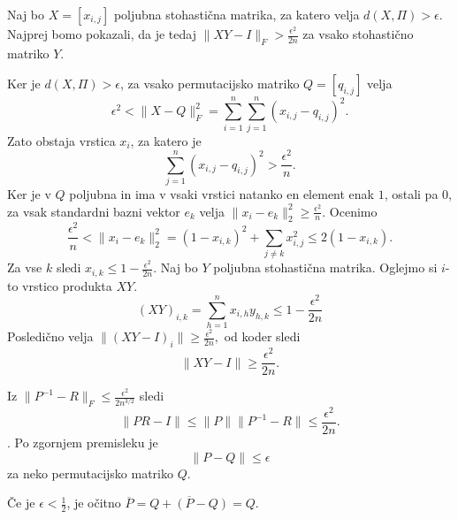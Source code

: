 \documentclass[mat2, tisk]{fmfdelo}
\begin{document}
\begin{dokaz}
  Naj bo $X=[x_{i,j}]$ poljubna  stohastična matrika,
  za katero velja
  $d(X,\Pi)>\epsilon$. Najprej
  bomo pokazali, da je tedaj
  $\|XY-I\|_F>\frac{\epsilon^{2}}{2n}$ za vsako
  stohastično matriko $Y$.

  Ker je $d(X,\Pi)>\epsilon$, za vsako permutacijsko
  matriko $Q=[q_{i,j}]$ velja
  \[
    \epsilon^{2} < \|X-Q\|_F^{2}
    = \sum_{i=1}^{n}\sum_{j=1}^{n}(x_{i,j}-q_{i,j})^{2}.
  \]
  Zato obstaja vrstica $x_i$, za katero je
  \[
    \sum_{j=1}^{n}(x_{i,j}-q_{i,j})^{2} > \frac{\epsilon^{2}}{n}.
  \]
  Ker je v $Q$ poljubna in ima v vsaki vrstici natanko
  en element enak $1$, ostali pa $0$, za vsak
  standardni bazni vektor $e_k$ velja
  $
  \|x_i-e_k\|_{2}^{2} \ge \frac{\epsilon^{2}}{n}.
  $
  Ocenimo
  $$
  \frac{\epsilon^{2}}{n} <
  \|x_i-e_k\|_{2}^{2}
  =(1-x_{i,k})^{2}+\sum_{j\ne k}x_{i,j}^{2}
  \le 2(1-x_{i,k}).
  $$
  Za vse $k$ sledi
  $
  x_{i,k} \le 1- \frac{\epsilon^{2}}{2n}
  $.
  Naj bo $Y$ poljubna stohastična matrika. Oglejmo si
  $i$-to vrstico produkta $XY$.
  \[
    (XY)_{i,k}=\sum_{h=1}^{n} x_{i,h}y_{h,k} \le
    1-\frac{\epsilon^{2}}{2n}
  \]
  Posledično velja
  $
  \|(XY-I)_i\|
  \ge \frac{\epsilon^{2}}{2n},
  $
  od koder sledi
  $$
  \|XY-I\| \ge \frac{\epsilon^{2}}{2n}.
  $$

  Iz $\|P^{-1}-R\|_F \le \frac{\epsilon^{2}}{2n^{3/2}}$
  sledi
  $$
  \|PR - I\| \le \|P\| \|P^{-1}-R\| \le \frac{\epsilon^{2}}{2n}.
  $$.
  Po zgornjem premisleku je
  $$
  \|P - Q\| \le \epsilon
  $$
  za neko permutacijsko matriko $Q$.

  Če je $\epsilon < \frac{1}{2}$, je očitno
  $\overline{P} = \overline{ Q + (P-Q)} = Q$.
\end{dokaz}
%
\end{document}
